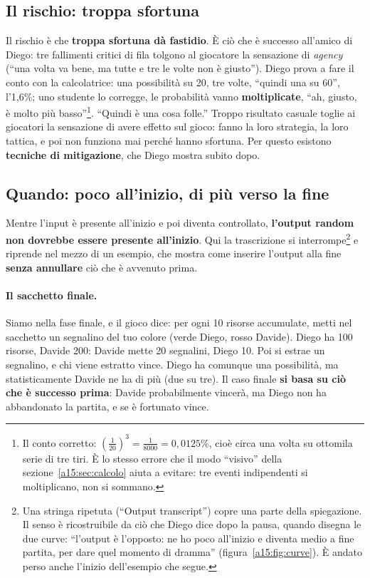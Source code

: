 \subsection{Il rischio: troppa sfortuna}

Il rischio è che \textbf{troppa sfortuna dà fastidio}. È ciò che è successo all'amico di
Diego: tre fallimenti critici di fila tolgono al giocatore la sensazione di \emph{agency}
(``una volta va bene, ma tutte e tre le volte non è giusto''). Diego prova a fare il conto con
la calcolatrice: una possibilità su 20, tre volte, ``quindi una su 60'', l'1,6\%; uno
studente lo corregge, le probabilità vanno \textbf{moltiplicate}, ``ah, giusto, è molto più
basso''\footnote{Il conto corretto: $\left(\tfrac1{20}\right)^3 = \tfrac1{8000} =
0{,}0125\%$, cioè circa una volta su ottomila serie di tre tiri. È lo stesso errore che il
modo ``visivo'' della sezione~\ref{a15:sec:calcolo} aiuta a evitare: tre eventi indipendenti
si moltiplicano, non si sommano.}. ``Quindi è una cosa folle.'' Troppo risultato casuale
toglie ai giocatori la sensazione di avere effetto sul gioco: fanno la loro strategia, la loro
tattica, e poi non funziona mai perché hanno sfortuna. Per questo esistono \textbf{tecniche
di mitigazione}, che Diego mostra subito dopo.

\subsection{Quando: poco all'inizio, di più verso la fine}

Mentre l'input è presente all'inizio e poi diventa controllato, \textbf{l'output random non
dovrebbe essere presente all'inizio}. Qui la trascrizione si interrompe\footnote{Una stringa
ripetuta (``Output transcript'') copre una parte della spiegazione. Il senso è ricostruibile
da ciò che Diego dice dopo la pausa, quando disegna le due curve: ``l'output è l'opposto: ne
ho poco all'inizio e diventa medio a fine partita, per dare quel momento di dramma''
(figura~\ref{a15:fig:curve}). È andato perso anche l'inizio dell'esempio che segue.} e
riprende nel mezzo di un esempio, che mostra come inserire l'output alla fine \textbf{senza
annullare} ciò che è avvenuto prima.

\paragraph{Il sacchetto finale.} Siamo nella fase finale, e il gioco dice: per ogni 10 risorse
accumulate, metti nel sacchetto un segnalino del tuo colore (verde Diego, rosso Davide). Diego
ha 100 risorse, Davide 200: Davide mette 20 segnalini, Diego 10. Poi si estrae un segnalino, e
chi viene estratto vince. Diego ha comunque una possibilità, ma statisticamente Davide ne ha
di più (due su tre). Il caso finale \textbf{si basa su ciò che è successo prima}: Davide
probabilmente vincerà, ma Diego non ha abbandonato la partita, e se è fortunato vince.

